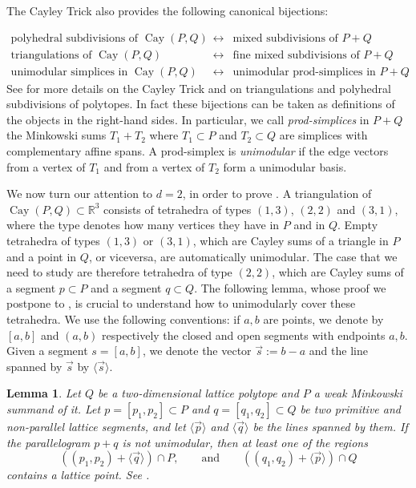 \documentclass{amsart}
\theoremstyle{plain}
\newtheorem{lemma}[theorem]{Lemma}
\theoremstyle{definition}
\newcommand{\R}{ \ensuremath{\mathbb{R}}}
\renewcommand{\int}{\operatorname{int}}
\renewcommand{\vec}[1]{\overrightarrow#1}
\newcommand{\vecline}[1]{\langle \vec #1 \rangle}
\newcommand{\cayley}{\operatorname{Cay}}
\newcommand{\paco}[1]{\todo[size=\tiny,color=green!30]{#1 \\ \hfill --- P.}}
\begin{document}

The Cayley Trick also provides the following canonical bijections:

\[
\begin{array}{ccc}
\text{polyhedral subdivisions of $\cayley(P,Q)$} &\leftrightarrow& \text{mixed subdivisions of $P + Q$}\\
\text{triangulations of $\cayley(P,Q)$} &\leftrightarrow& \text{fine mixed subdivisions of $P + Q$}\\
\text{unimodular simplices in $\cayley(P,Q)$} &\leftrightarrow& \text{unimodular prod-simplices in $P + Q$}.
\end{array}
\]
See \cite{DLRS2010} for more details on the Cayley Trick and on triangulations and polyhedral subdivisions of polytopes.
In fact these bijections can be taken as definitions of the objects in the right-hand sides. In particular, 
we call \emph{prod-simplices} in $P+Q$ the Minkowski sums $T_1+T_2$ where $T_1\subset P$ and $T_2\subset Q$ are simplices with complementary affine spans. A prod-simplex is \emph{unimodular} if the edge vectors from a vertex of $T_1$ and from a vertex of $T_2$ form a unimodular basis.

\medskip

We now turn our attention to $d=2$, in order to prove . A triangulation of $\cayley(P,Q)\subset \R^3$ consists of tetrahedra of types $(1,3)$, $(2,2)$ and $(3,1)$, where the type denotes how many vertices they have in $P$ and in $Q$. Empty tetrahedra of types $(1,3)$ or $(3,1)$, which are Cayley sums of a triangle in $P$ and a point in $Q$, or viceversa, are automatically unimodular. The case that we need to study are therefore tetrahedra of type $(2,2)$, which are Cayley sums of a segment $p\subset P$ and a segment $q\subset Q$.
The following lemma, whose proof we postpone to , is crucial to understand how to unimodularly cover these tetrahedra. 
We use the following conventions: if $a, b$ are points, we denote by $[a,b]$ and $(a,b)$ respectively the closed and open segments with endpoints $a,b$. Given a segment $s=[a,b]$, we denote the vector $\vec s:= b-a$ and  the line spanned by $\vec s$ by $\vecline s$.

\begin{lemma}
\label{lemma:cayley}
Let $Q$ be a two-dimensional lattice polytope and $P$ a weak Minkowski summand of it. 
Let $p=[p_1,p_2] \subset P$ and $q=[q_1,q_2]\subset Q$ be two primitive and non-parallel lattice segments, and let $\vecline p$ and $ \vecline q$ be the lines spanned by them.  If the parallelogram $p + q$ is not unimodular, then at least one of the regions
\[
((p_1, p_2) + \vecline q ) \cap P, 
\qquad \text{and} \qquad
((q_1, q_2) + \vecline p ) \cap Q
\]
contains a lattice point. See .
\end{lemma}
\end{document}
